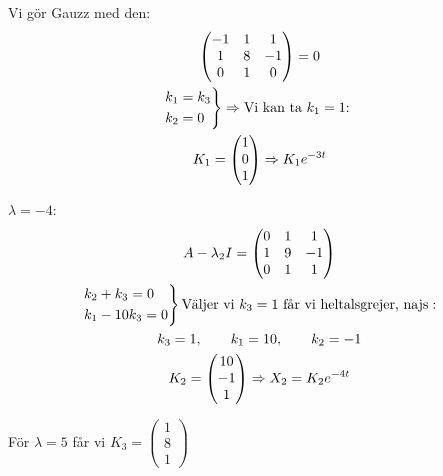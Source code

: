 \par\bigskip
\noindent Vi gör Gauzz med den:
\begin{equation*}
  \begin{gathered}
    \begin{pmatrix}-1&1&1\\1&8&-1\\0&1&0\end{pmatrix} = 0\\
    \begin{rcases*}
      k_1 = k_3\\
      k_2 = 0
    \end{rcases*}\Rightarrow\text{Vi kan ta $k_1 = 1$: }\\
    K_1 = \begin{pmatrix}1\\0\\1\end{pmatrix}\Rightarrow K_1e^{-3t}
  \end{gathered}
\end{equation*}
\par\bigskip
\noindent $\lambda=-4$:
\begin{equation*}
  \begin{gathered}
    A-\lambda_2I = \begin{pmatrix}0&1&1\\1&9&-1\\0&1&1\end{pmatrix}\\
    \begin{rcases*}
      k_2+k_3 = 0\\
      k_1-10k_3 = 0
    \end{rcases*}\text{Väljer vi $k_3=1$ får vi heltalsgrejer, najs}:\\
    k_3 = 1,\qquad k_1=10,\qquad k_2=-1\\
    K_2 = \begin{pmatrix}10\\-1\\1\end{pmatrix}\Rightarrow X_2 = K_2e^{-4t}
  \end{gathered}
\end{equation*}
\par\bigskip
\noindent För $\lambda = 5$ får vi $K_3=\begin{pmatrix}1\\8\\1\end{pmatrix}$
\par\bigskip
